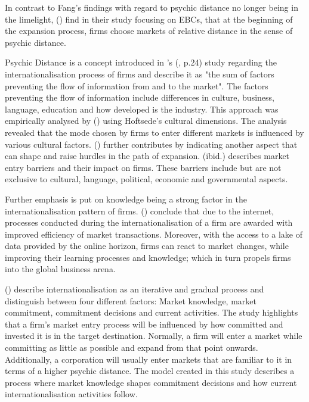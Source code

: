\documentclass[11pt,a4paper]{article}
\begin{document}
In contrast to Fang's findings with regard to psychic distance no longer being in the limelight, \citeauthor{forsgrenIgnorantImpatientInternationalization2007} (\citeyear{forsgrenIgnorantImpatientInternationalization2007})  find in their study focusing on EBCs, that at the beginning of the expansion process, firms choose markets of relative distance in the sense of psychic distance. \par
Psychic Distance is a concept introduced in \citeauthor{johansonInternationalizationProcessFirm1977}'s (\citeyear{johansonInternationalizationProcessFirm1977}, p.24) study regarding the internationalisation process of firms and describe it as "the sum of factors preventing the flow of information from and to the market". The factors preventing the flow of information include differences in culture, business, language, education and how developed is the industry.  This approach was empirically analysed by \citeauthor{kogutEffectNationalCulture1988} (\citeyear{kogutEffectNationalCulture1988}) using Hoftsede's cultural dimensions. The analysis revealed that the mode chosen by firms to enter different markets is influenced by various cultural factors. 
\citeauthor{karakayaBarriersEntryInternational1993} (\citeyear{karakayaBarriersEntryInternational1993}) further contributes  by indicating another aspect that can shape and raise hurdles in the path of expansion. \citeauthor{karakayaBarriersEntryInternational1993} (ibid.) describes market entry barriers and their impact on firms. These barriers include but are not exclusive to cultural, language, political, economic and governmental aspects. \par
Further emphasis is put on knowledge being a strong factor in the internationalisation pattern of firms. \citeauthor{petersenInternetForeignMarket2002} (\citeyear{petersenInternetForeignMarket2002}) conclude that due to the internet, processes conducted during the internationalisation of a firm are awarded with improved efficiency of market transactions. Moreover, with the access to a lake of data provided by the online horizon, firms can react to market changes, while improving their learning processes and knowledge; which in turn propels firms into the global business arena. \par 
\citeauthor{johansonInternationalizationProcessFirm1977} (\citeyear{johansonInternationalizationProcessFirm1977}) describe internationalisation as an iterative and gradual process and distinguish between four different factors: Market knowledge, market commitment, commitment decisions and current activities. The study highlights that a firm's market entry process will be influenced by how committed and invested it is in the target destination. Normally, a firm will enter a market while committing as little as possible and expand from that point onwards. Additionally, a corporation will usually enter markets that are familiar to it in terms of a higher psychic distance. The model created in this study describes a process where market knowledge shapes commitment decisions and how current internationalisation activities follow.  \par
\end{document}
